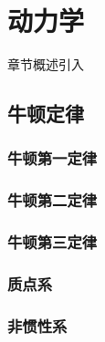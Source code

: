 \chapter{动力学}\label{3}

章节概述引入

\section{牛顿定律}\label{3-1}

\subsection{牛顿第一定律}\label{3-1-1}

\subsection{牛顿第二定律}\label{3-1-2}

\subsection{牛顿第三定律}\label{3-1-3}

\subsection{质点系}\label{3-1-4}

\subsection{非惯性系}\label{3-1-5} 